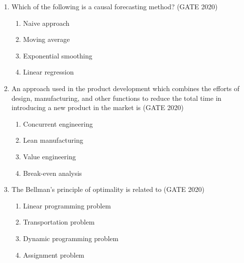 \documentclass[journal,12pt,onecolumn]{IEEEtran}
\theoremstyle{remark}
\begin{document}
\begin{enumerate}
\vspace{1cm}

\item Which of the following is a causal forecasting method?
\hfill{(GATE 2020)}

\begin{enumerate}
    \item Naive approach
    \item Moving average
    \item Exponential smoothing
    \item Linear regression
\end{enumerate}

\vspace{1cm}

\item An approach used in the product development which combines the efforts of design, manufacturing, and other functions to reduce the total time in introducing a new product in the market is
\hfill{(GATE 2020)}
\begin{multicols}{4}
\begin{enumerate}
    \item Concurrent engineering
    \item Lean manufacturing
    \item Value engineering
    \item Break-even analysis
\end{enumerate}
\end{multicols}
\vspace{1cm}

\item The Bellman's principle of optimality is related to
\hfill{(GATE 2020)}
\begin{multicols}{4}
\begin{enumerate}
    \item Linear programming problem
    \item Transportation problem
    \item Dynamic programming problem
    \item Assignment problem
\end{enumerate}
\end{multicols}
\vspace{1cm}


\end{enumerate}
\end{document}
